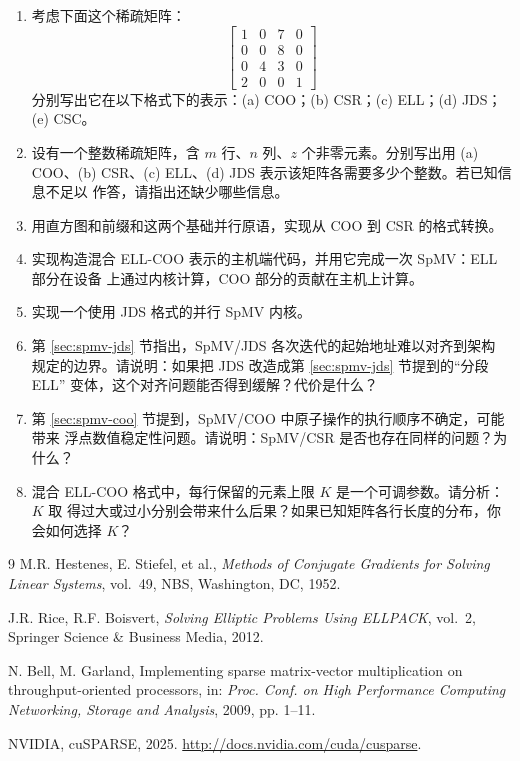 \begin{enumerate}[label=\arabic*.,leftmargin=2.7em]
  \item 考虑下面这个稀疏矩阵：
  \[
    \begin{bmatrix}
      1 & 0 & 7 & 0\\
      0 & 0 & 8 & 0\\
      0 & 4 & 3 & 0\\
      2 & 0 & 0 & 1
    \end{bmatrix}
  \]
  分别写出它在以下格式下的表示：(a) COO；(b) CSR；(c) ELL；(d) JDS；(e) CSC。

  \item 设有一个整数稀疏矩阵，含 $m$ 行、$n$ 列、$z$ 个非零元素。分别写出用
  (a) COO、(b) CSR、(c) ELL、(d) JDS 表示该矩阵各需要多少个整数。若已知信息不足以
  作答，请指出还缺少哪些信息。

  \item 用直方图和前缀和这两个基础并行原语，实现从 COO 到 CSR 的格式转换。

  \item 实现构造混合 ELL-COO 表示的主机端代码，并用它完成一次 SpMV：ELL 部分在设备
  上通过内核计算，COO 部分的贡献在主机上计算。

  \item 实现一个使用 JDS 格式的并行 SpMV 内核。

  \item 第 \ref{sec:spmv-jds} 节指出，SpMV/JDS 各次迭代的起始地址难以对齐到架构
  规定的边界。请说明：如果把 JDS 改造成第 \ref{sec:spmv-jds} 节提到的“分段 ELL”
  变体，这个对齐问题能否得到缓解？代价是什么？

  \item 第 \ref{sec:spmv-coo} 节提到，SpMV/COO 中原子操作的执行顺序不确定，可能带来
  浮点数值稳定性问题。请说明：SpMV/CSR 是否也存在同样的问题？为什么？

  \item 混合 ELL-COO 格式中，每行保留的元素上限 $K$ 是一个可调参数。请分析：$K$ 取
  得过大或过小分别会带来什么后果？如果已知矩阵各行长度的分布，你会如何选择 $K$？
\end{enumerate}

\begin{chapterbibliography}{9}
  M.R. Hestenes, E. Stiefel, et al., \emph{Methods of Conjugate Gradients for
  Solving Linear Systems}, vol.~49, NBS, Washington, DC, 1952.

  J.R. Rice, R.F. Boisvert, \emph{Solving Elliptic Problems Using ELLPACK},
  vol.~2, Springer Science \& Business Media, 2012.

  N. Bell, M. Garland, Implementing sparse matrix-vector multiplication on
  through\-put-oriented processors, in: \emph{Proc. Conf. on High Performance
  Computing Networking, Storage and Analysis}, 2009, pp. 1--11.

  NVIDIA, cuSPARSE, 2025. \url{http://docs.nvidia.com/cuda/cusparse}.
\end{chapterbibliography}
